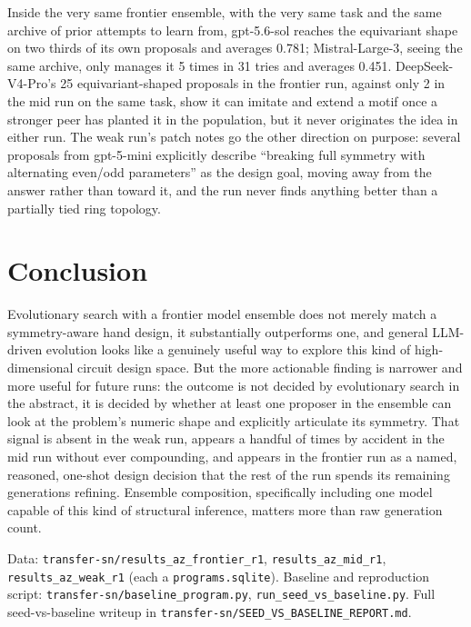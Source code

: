\documentclass{article}
\begin{document}
Inside the very same frontier ensemble, with the very same task and the same
archive of prior attempts to learn from, gpt-5.6-sol reaches the equivariant
shape on two thirds of its own proposals and averages 0.781; Mistral-Large-3,
seeing the same archive, only manages it 5 times in 31 tries and averages
0.451. DeepSeek-V4-Pro's 25 equivariant-shaped proposals in the frontier run,
against only 2 in the mid run on the same task, show it can imitate and
extend a motif once a stronger peer has planted it in the population, but it
never originates the idea in either run. The weak run's patch notes go the
other direction on purpose: several proposals from gpt-5-mini explicitly
describe ``breaking full symmetry with alternating even/odd parameters'' as
the design goal, moving away from the answer rather than toward it, and the
run never finds anything better than a partially tied ring topology.

\section*{Conclusion}
Evolutionary search with a frontier model ensemble does not merely match a
symmetry-aware hand design, it substantially outperforms one, and general
LLM-driven evolution looks like a genuinely useful way to explore this kind
of high-dimensional circuit design space. But the more actionable finding is
narrower and more useful for future runs: the outcome is not decided by
evolutionary search in the abstract, it is decided by whether at least one
proposer in the ensemble can look at the problem's numeric shape and
explicitly articulate its symmetry. That signal is absent in the weak run,
appears a handful of times by accident in the mid run without ever
compounding, and appears in the frontier run as a named, reasoned,
one-shot design decision that the rest of the run spends its remaining
generations refining. Ensemble composition, specifically including one model
capable of this kind of structural inference, matters more than raw
generation count.

\vspace{4pt}
\noindent\small\sloppy Data: \texttt{transfer-sn/results\_az\_frontier\_r1},
\texttt{results\_az\_mid\_r1}, \texttt{results\_az\_weak\_r1} (each a
\texttt{programs.sqlite}). Baseline and reproduction script:
\texttt{transfer-sn/baseline\_program.py}, \texttt{run\_seed\_vs\_baseline.py}.
Full seed-vs-baseline writeup in \texttt{transfer-sn/SEED\_VS\_BASELINE\_REPORT.md}.
\end{document}
